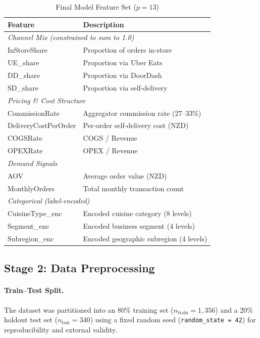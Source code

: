 \documentclass[10pt,a4paper,twocolumn]{article}
\begin{document}
\begin{table}[H]
\caption{Final Model Feature Set ($p = 13$)}
\label{tab:features}
\small
\begin{tabularx}{\columnwidth}{l X}
\toprule
\textbf{Feature} & \textbf{Description} \\
\midrule
\multicolumn{2}{l}{\textit{Channel Mix (constrained to sum to 1.0)}} \\
InStoreShare   & Proportion of orders in-store \\
UE\_share      & Proportion via Uber Eats \\
DD\_share      & Proportion via DoorDash \\
SD\_share      & Proportion via self-delivery \\
\midrule
\multicolumn{2}{l}{\textit{Pricing \& Cost Structure}} \\
CommissionRate      & Aggregator commission rate (27--33\%) \\
DeliveryCostPerOrder & Per-order self-delivery cost (NZD) \\
COGSRate            & COGS / Revenue \\
OPEXRate            & OPEX / Revenue \\
\midrule
\multicolumn{2}{l}{\textit{Demand Signals}} \\
AOV            & Average order value (NZD) \\
MonthlyOrders  & Total monthly transaction count \\
\midrule
\multicolumn{2}{l}{\textit{Categorical (label-encoded)}} \\
CuisineType\_enc & Encoded cuisine category (8 levels) \\
Segment\_enc     & Encoded business segment (4 levels) \\
Subregion\_enc   & Encoded geographic subregion (4 levels) \\
\bottomrule
\end{tabularx}
\end{table}

\subsection{Stage 2: Data Preprocessing}
\label{sec:preprocessing}

\paragraph{Train–Test Split.}
The dataset was partitioned into an 80\% training set ($n_{\text{train}} = 1{,}356$)
and a 20\% holdout test set ($n_{\text{test}} = 340$) using a fixed random seed
(\texttt{random\_state = 42}) for reproducibility and external validity.
\end{document}
